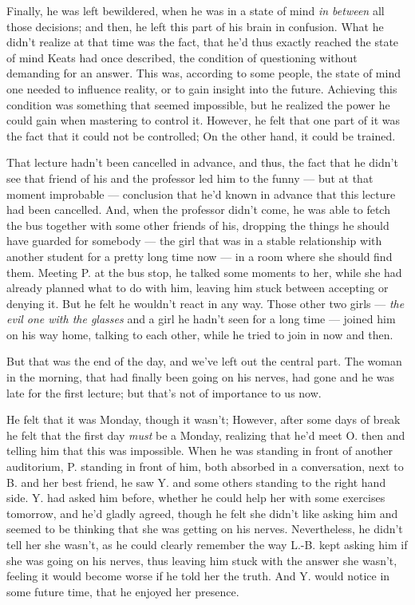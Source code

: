 Finally, he was left bewildered, when he was in a state of mind \emph{in between} all those decisions; and then, he left this part of his brain in confusion. What he didn't realize at that time was the fact, that he'd thus exactly reached the state of mind Keats had once described, the condition of questioning without demanding for an answer. This was, according to some people, the state of mind one needed to influence reality, or to gain insight into the future. Achieving this condition was something that seemed impossible, but he realized the power he could gain when mastering to control it. However, he felt that one part of it was the fact that it could not be controlled; On the other hand, it could be trained.

That lecture hadn't been cancelled in advance, and thus, the fact that he didn't see that friend of his and the professor led him to the funny --- but at that moment improbable --- conclusion that he'd known in advance that this lecture had been cancelled. And, when the professor didn't come, he was able to fetch the bus together with some other friends of his, dropping the things he should have guarded for somebody --- the girl that was in a stable relationship with another student for a pretty long time now --- in a room where she should find them. Meeting P. at the bus stop, he talked some moments to her, while she had already planned what to do with him, leaving him stuck between accepting or denying it. But he felt he wouldn't react in any way. Those other two girls --- \emph{the evil one with the glasses} and a girl he hadn't seen for a long time --- joined him on his way home, talking to each other, while he tried to join in now and then.

But that was the end of the day, and we've left out the central part. The woman in the morning, that had finally been going on his nerves, had gone and he was late for the first lecture; but that's not of importance to us now.

He felt that it was Monday, though it wasn't; However, after some days of break he felt that the first day \emph{must} be a Monday, realizing that he'd meet O. then and telling him that this was impossible. 
When he was standing in front of another auditorium, P. standing in front of him, both absorbed in a conversation, next to B. and her best friend, he saw Y. and some others standing to the right hand side. Y. had asked him before, whether he could help her with some exercises tomorrow, and he'd gladly agreed, though he felt she didn't like asking him and seemed to be thinking that she was getting on his nerves. Nevertheless, he didn't tell her she wasn't, as he could clearly remember the way L.-B. kept asking him if she was going on his nerves, thus leaving him stuck with the answer she wasn't, feeling it would become worse if he told her the truth. And Y. would notice in some future time, that he enjoyed her presence.

